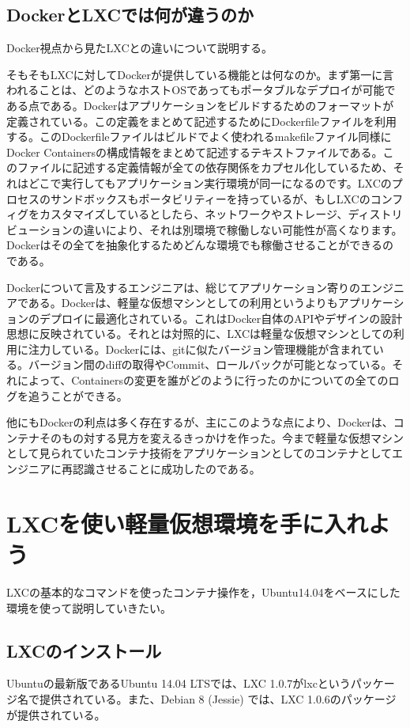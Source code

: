 \documentclass[9pt,b5paper,tombo]{jsbook}
\begin{document}
\subsection{DockerとLXCでは何が違うのか}
Docker視点から見たLXCとの違いについて説明する。

そもそもLXCに対してDockerが提供している機能とは何なのか。まず第一に言われることは、どのようなホストOSであってもポータブルなデプロイが可能である点である。Dockerはアプリケーションをビルドするためのフォーマットが定義されている。この定義をまとめて記述するためにDockerfileファイルを利用する。このDockerfileファイルはビルドでよく使われるmakefileファイル同様にDocker Containersの構成情報をまとめて記述するテキストファイルである。このファイルに記述する定義情報が全ての依存関係をカプセル化しているため、それはどこで実行してもアプリケーション実行環境が同一になるのです。LXCのプロセスのサンドボックスもポータビリティーを持っているが、もしLXCのコンフィグをカスタマイズしているとしたら、ネットワークやストレージ、ディストリビューションの違いにより、それは別環境で稼働しない可能性が高くなります。Dockerはその全てを抽象化するためどんな環境でも稼働させることができるのである。

Dockerについて言及するエンジニアは、総じてアプリケーション寄りのエンジニアである。Dockerは、軽量な仮想マシンとしての利用というよりもアプリケーションのデプロイに最適化されている。これはDocker自体のAPIやデザインの設計思想に反映されている。それとは対照的に、LXCは軽量な仮想マシンとしての利用に注力している。Dockerには、gitに似たバージョン管理機能が含まれている。バージョン間のdiffの取得やCommit、ロールバックが可能となっている。それによって、Containersの変更を誰がどのように行ったのかについての全てのログを追うことができる。

他にもDockerの利点は多く存在するが、主にこのような点により、Dockerは、コンテナそのもの対する見方を変えるきっかけを作った。今まで軽量な仮想マシンとして見られていたコンテナ技術をアプリケーションとしてのコンテナとしてエンジニアに再認識させることに成功したのである。

\section{LXCを使い軽量仮想環境を手に入れよう}
LXCの基本的なコマンドを使ったコンテナ操作を，Ubuntu14.04をベースにした環境を使って説明していきたい。

\subsection{LXCのインストール}
Ubuntuの最新版であるUbuntu 14.04 LTSでは、LXC 1.0.7がlxcというパッケージ名で提供されている。また、Debian 8 (Jessie) では、LXC 1.0.6のパッケージが提供されている。
\end{document}
